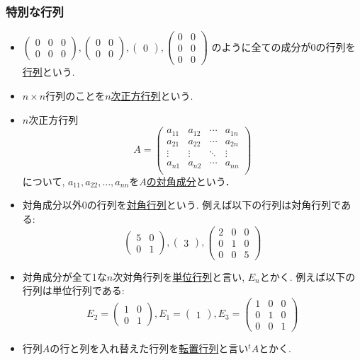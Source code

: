 \documentclass[dvipdfmx,a4paper,11pt]{article}
\theoremstyle{definition}
\begin{document}
\subsubsection{特別な行列}
\begin{itemize}
\item  $
 \begin{pmatrix}
0 &0&0\\
0 &0&0
 \end{pmatrix}, 
  \begin{pmatrix}
0 &0\\
0 &0
 \end{pmatrix}, 
   \begin{pmatrix}
0 
 \end{pmatrix}, 
   \begin{pmatrix}
0 &0\\
0 &0 \\
0&0
 \end{pmatrix}
 $
 のように全ての成分が0の行列を\underline{行列}という.
 \item $n \times n$行列のことを\underline{$n$次正方行列}という.
 \item $n$次正方行列
 $$
 A =
 \begin{pmatrix}
a_{11}& a_{12} & \cdots &a_{1n} \\
a_{21}& a_{22} & \cdots &a_{2n} \\
\vdots& \vdots	&	\ddots   &	\vdots \\
a_{n1}& a_{n2} & \cdots &a_{nn} \\
\end{pmatrix}
 $$
 について, $a_{11}, a_{22}, \ldots, a_{nn}$を\underline{$A$の対角成分}という．
 \item 対角成分以外0の行列を\underline{対角行列}という. 例えば以下の行列は対角行列である:
  $$
 \begin{pmatrix}
5&0\\
0 &1
 \end{pmatrix}, 
  \begin{pmatrix}
3
 \end{pmatrix}, 
   \begin{pmatrix}
2&0 &0\\
0 &1 &0\\
0&0&5
 \end{pmatrix}
 $$
 \item 対角成分が全て1な$n$次対角行列を\underline{単位行列}と言い, $E_n$とかく. 例えば以下の行列は単位行列である:
   $$
   E_2 =
 \begin{pmatrix}
1&0\\
0 &1
 \end{pmatrix}, 
 E_1=
  \begin{pmatrix}
1
 \end{pmatrix}, 
 E_3=
   \begin{pmatrix}
1&0 &0\\
0 &1 &0\\
0&0&1
 \end{pmatrix}
 $$
 \item 行列$A$の行と列を入れ替えた行列を\underline{転置行列}と言い${}^{t}A$とかく.
\end{itemize}
\end{document}
